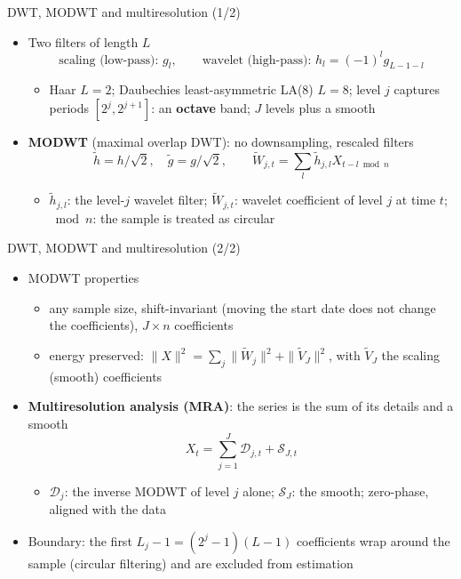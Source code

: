\begin{frame}{DWT, MODWT and multiresolution (1/2)}
\itemsize{\small}
\begin{itemize}
    \item Two filters of length $L$ 
    \[ \text{scaling (low-pass): } g_l, \qquad \text{wavelet (high-pass): } h_l = (-1)^lg_{L-1-l} \]
    \begin{itemize}
        \item Haar $L = 2$; Daubechies least-asymmetric LA(8) $L = 8$; level $j$ captures periods $[2^j, 2^{j+1}]$: an \textbf{octave} band; $J$ levels plus a smooth
    \end{itemize}
    \item \textbf{MODWT} (maximal overlap DWT): no downsampling, rescaled filters
    \[ \tilde h = h/\sqrt2, \quad \tilde g = g/\sqrt2, \qquad \tilde W_{j,t} = \sum_l\tilde h_{j,l}X_{t-l \bmod n} \]
    \begin{itemize}
        \item $\tilde h_{j,l}$: the level-$j$ wavelet filter; $\tilde W_{j,t}$: wavelet coefficient of level $j$ at time $t$; $\bmod n$: the sample is treated as circular
    \end{itemize}
\end{itemize}
\end{frame}

\begin{frame}{DWT, MODWT and multiresolution (2/2)}
\itemsize{\small}
\begin{itemize}
    \item MODWT properties
    \begin{itemize}
        \item any sample size, shift-invariant (moving the start date does not change the coefficients), $J \times n$ coefficients
        \item energy preserved: $\|X\|^2 = \sum_j\|\tilde W_j\|^2 + \|\tilde V_J\|^2$, with $\tilde V_J$ the scaling (smooth) coefficients
    \end{itemize}
    \item \textbf{Multiresolution analysis (MRA)}: the series is the sum of its details and a smooth
    \[ X_t = \sum_{j=1}^J\mathcal D_{j,t} + \mathcal S_{J,t} \]
    \begin{itemize}
        \item $\mathcal D_j$: the inverse MODWT of level $j$ alone; $\mathcal S_J$: the smooth; zero-phase, aligned with the data
    \end{itemize}
    \item Boundary: the first $L_j - 1 = (2^j - 1)(L - 1)$ coefficients wrap around the sample (circular filtering) and are excluded from estimation
\end{itemize}
\end{frame}

